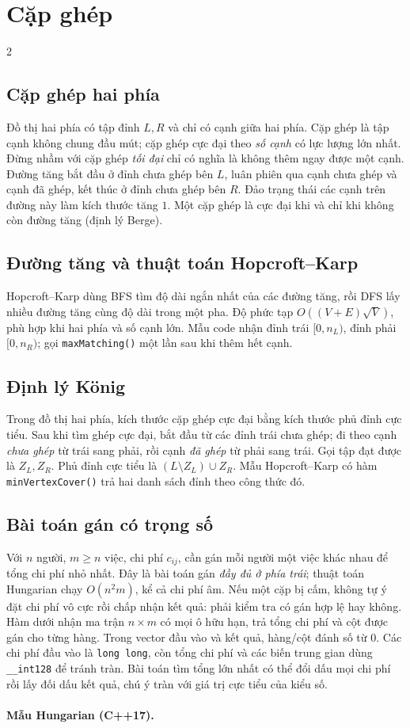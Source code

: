 \section{Cặp ghép}
\begingroup\small
\begin{multicols}{2}
\subsection{Cặp ghép hai phía}
Đồ thị hai phía có tập đỉnh $L,R$ và chỉ có cạnh giữa hai phía.
Cặp ghép là tập cạnh không chung đầu mút; cặp ghép cực đại theo
\emph{số cạnh} có lực lượng lớn nhất. Đừng nhầm với cặp ghép
\emph{tối đại} chỉ có nghĩa là không thêm ngay được một cạnh.
Đường tăng bắt đầu ở đỉnh chưa ghép bên $L$, luân phiên qua cạnh
chưa ghép và cạnh đã ghép, kết thúc ở đỉnh chưa ghép bên $R$.
Đảo trạng thái các cạnh trên đường này làm kích thước tăng $1$.
Một cặp ghép là cực đại khi và chỉ khi không còn đường tăng
(định lý Berge).

\subsection{Đường tăng và thuật toán Hopcroft--Karp}
Hopcroft--Karp dùng BFS tìm độ dài ngắn nhất của các đường tăng,
rồi DFS lấy nhiều đường tăng cùng độ dài trong một pha.
Độ phức tạp $O((V+E)\sqrt V)$, phù hợp khi hai phía và số cạnh lớn.
Mẫu code nhận đỉnh trái $[0,n_L)$, đỉnh phải $[0,n_R)$; gọi
\texttt{maxMatching()} một lần sau khi thêm hết cạnh.

\subsection{Định lý König}
Trong đồ thị hai phía, kích thước cặp ghép cực đại bằng kích
thước phủ đỉnh cực tiểu. Sau khi tìm ghép cực đại, bắt đầu từ
các đỉnh trái chưa ghép; đi theo cạnh \emph{chưa ghép} từ trái
sang phải, rồi cạnh \emph{đã ghép} từ phải sang trái.
Gọi tập đạt được là $Z_L,Z_R$. Phủ đỉnh cực tiểu là
$(L\setminus Z_L)\cup Z_R$. Mẫu Hopcroft--Karp có hàm
\texttt{minVertexCover()} trả hai danh sách đỉnh theo công thức đó.

\subsection{Bài toán gán có trọng số}
Với $n$ người, $m\ge n$ việc, chi phí $c_{ij}$, cần gán mỗi
người một việc khác nhau để tổng chi phí nhỏ nhất. Đây là bài
toán gán \emph{đầy đủ ở phía trái}; thuật toán Hungarian chạy
$O(n^2m)$, kể cả chi phí âm. Nếu một cặp bị cấm, không tự ý
đặt chi phí vô cực rồi chấp nhận kết quả: phải kiểm tra có
gán hợp lệ hay không. Hàm dưới nhận ma trận $n\times m$ có
mọi ô hữu hạn, trả tổng chi phí và cột được gán cho từng hàng.
Trong vector đầu vào và kết quả, hàng/cột đánh số từ $0$.
Các chi phí đầu vào là \texttt{long long}, còn tổng chi phí
và các biến trung gian dùng \texttt{\_\_int128} để tránh tràn.
Bài toán tìm tổng lớn nhất có thể đổi dấu mọi chi phí rồi lấy
đối dấu kết quả, chú ý tràn với giá trị cực tiểu của kiểu số.

\vspace{-4mm}
\paragraph{Mẫu Hungarian (C++17).}
\end{multicols}
\endgroup
